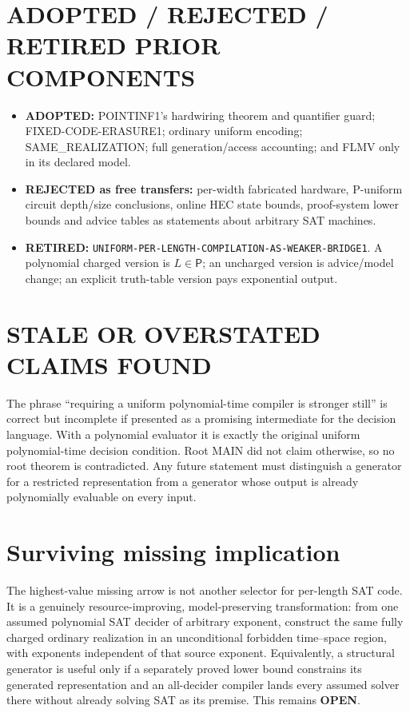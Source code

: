 \documentclass[11pt]{article}
\newcommand{\Pclass}{\mathsf{P}}
\newcommand{\OPEN}{\textbf{OPEN}}
\begin{document}
\section{ADOPTED / REJECTED / RETIRED PRIOR COMPONENTS}

\begin{itemize}
\item \textbf{ADOPTED:} POINTINF1's hardwiring theorem and quantifier guard;
FIXED-CODE-ERASURE1; ordinary uniform encoding; SAME\_REALIZATION; full
generation/access accounting; and FLMV only in its declared model.
\item \textbf{REJECTED as free transfers:} per-width fabricated hardware,
P-uniform circuit depth/size conclusions, online HEC state bounds, proof-system
lower bounds and advice tables as statements about arbitrary SAT machines.
\item \textbf{RETIRED:}
\texttt{UNIFORM-PER-LENGTH-COMPILATION-AS-WEAKER-BRIDGE1}.  A polynomial
charged version is \(L\in\Pclass\); an uncharged version is advice/model
change; an explicit truth-table version pays exponential output.
\end{itemize}

\section{STALE OR OVERSTATED CLAIMS FOUND}

The phrase ``requiring a uniform polynomial-time compiler is stronger still''
is correct but incomplete if presented as a promising intermediate for the
decision language.  With a polynomial evaluator it is exactly the original
uniform polynomial-time decision condition.  Root MAIN did not claim
otherwise, so no root theorem is contradicted.  Any future statement must
distinguish a generator for a restricted representation from a generator whose
output is already polynomially evaluable on every input.

\section{Surviving missing implication}

The highest-value missing arrow is not another selector for per-length SAT
code.  It is a genuinely resource-improving, model-preserving transformation:
from one assumed polynomial SAT decider of arbitrary exponent, construct the
same fully charged ordinary realization in an unconditional forbidden
time--space region, with exponents independent of that source exponent.
Equivalently, a structural generator is useful only if a separately proved
lower bound constrains its generated representation and an all-decider
compiler lands every assumed solver there without already solving SAT as its
premise.  This remains \OPEN.
\end{document}
